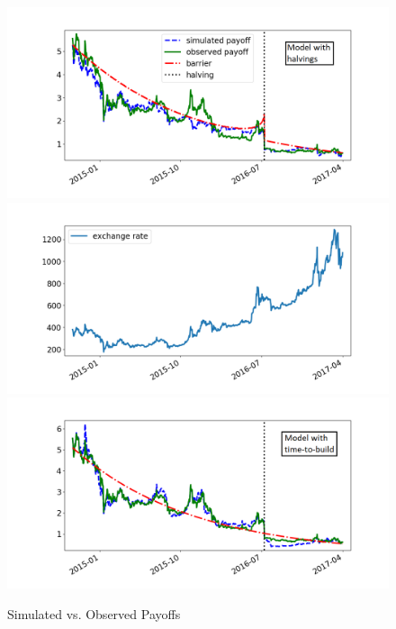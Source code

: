 \documentclass[12pt, a4paper]{article}
\begin{document}
\begin{figure}[]
\caption{Simulated vs. Observed Payoffs}
\label{fig:payoffs}\centering
\includegraphics[scale=0.48]{images/P_P_sim_hf_2_wide.png}
\includegraphics[scale=0.50]{images/cours2_wide.png}
\includegraphics[scale=0.48]{images/P_P_sim_delay_2_wide.png}
\end{figure}
\end{document}
